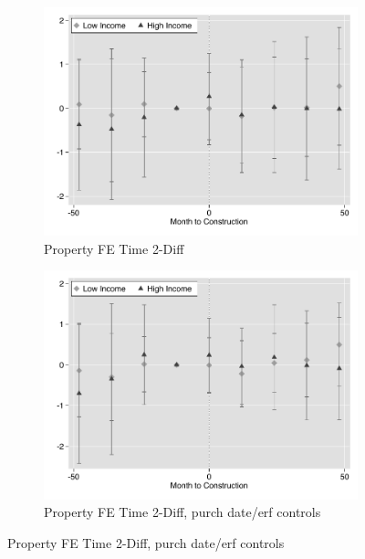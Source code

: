 \documentclass[12pt]{article}
\begin{document}
\begin{figure}
\begin{subfigure}[b]{0.48\textwidth}
        \end{subfigure}
        \begin{subfigure}[b]{0.48\textwidth}
                    \caption[Network2]%
            {{\footnotesize Property FE Time 2-Diff}}    
            \label{fig:prefor}
            \centering
            \includegraphics[width=\textwidth,trim={0.3cm .3cm 0.1cm 0cm}, clip=true]{figures/price_time_2d_no_ctrl_pfe}
        \end{subfigure}
        \hfill
        \begin{subfigure}[b]{0.48\textwidth}
                    \caption[Network2]%
            {{\footnotesize Property FE Time 2-Diff, purch date/erf controls}}    
            \label{fig:prefor}
            \centering
            \includegraphics[width=\textwidth,trim={0.3cm .3cm 0.1cm 0cm}, clip=true]{figures/price_time_2d_ctrl_pfe}
        \end{subfigure}
\end{figure}
\end{document}
